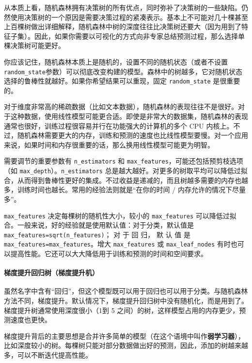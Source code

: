从本质上看，随机森林拥有决策树的所有优点，同时弥补了决策树的一些缺陷。仍然使用决策树的一个原因是需要决策过程的紧凑表示。基本上不可能对几十棵甚至上百棵树做出详细解释，随机森林中树的深度往往比决策树还要大（因为用到了特征子集）。因此，如果你需要以可视化的方式向非专家总结预测过程，那么选择单棵决策树可能更好。

\begin{tcolorbox}
    你应该记住，随机森林本质上是随机的，设置不同的随机状态（或者不设置 \verb|random_state|参数）可以彻底改变构建的模型。森林中的树越多，它对随机状态选择的鲁棒性就越好。如果你希望结果可以重现，固定 \verb|random_state| 是很重要的。
\end{tcolorbox}


对于维度非常高的稀疏数据（比如文本数据），随机森林的表现往往不是很好。对于这种数据，使用线性模型可能更合适。即使是非常大的数据集，随机森林的表现通常也很好，训练过程很容易并行在功能强大的计算机的多个 CPU 内核上。不过，随机森林需要更大的内存，训练和预测的速度也比线性模型要慢。对一个应用来说，如果时间和内存很重要的话，那么换用线性模型可能更为明智。

需要调节的重要参数有 \verb|n_estimators| 和 \verb|max_features|，可能还包括预剪枝选项（如 \verb|max_depth|）。\verb|n_estimators| 总是越大越好。对更多的树取平均可以降低过拟合，从而得到鲁棒性更好的集成。不过收益是递减的，而且树越多需要的内存也越多，训练时间也越长。常用的经验法则就是“在你的时间 / 内存允许的情况下尽量多”。

\verb|max_features| 决定每棵树的随机性大小，较小的 \verb|max_features| 可以降低过拟合。一般来说，好的经验就是使用默认值：对于分类，默认值是 \verb|max_features=sqrt(n_features)|； 对 于 回 归， 默 认 值 是 \verb|max_features=max_features|。增大 \verb|max_features| 或 \verb|max_leaf_nodes| 有时也可以提高性能。它还可以大大降低用于训练和预测的时间和空间要求。

\paragraph{梯度提升回归树（梯度提升机）} 虽然名字中含有“回归”，但这个模型既可以用于回归也可以用于分类。与随机森林方法不同，梯度提升。默认情况下，梯度提升回归树中没有随机化，而是用到了。梯度提升树通常使用深度很小（1到 5 之间）的树，这样模型占用的内存更少，预测速度也更快。

梯度提升背后的主要思想是合并许多简单的模型（在这个语境中叫作\textbf{弱学习器}），比如深度较小的树。每棵树只能对部分数据做出好的预测，因此，添加的树越来越多，可以不断迭代提高性能。

